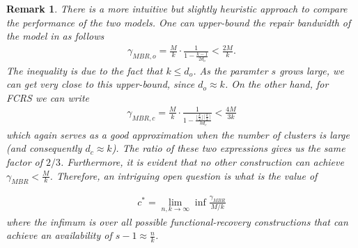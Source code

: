 \documentclass[journal,onecolumn,draftcls]{IEEEtran}
\newtheorem{rem}{Remark}
\begin{document}
\begin{rem}
There is a more intuitive but slightly heuristic approach to compare the performance of the two models. One can  upper-bound the repair bandwidth of the model in \cite{dimakis2010network} as follows
\begin{eqnarray}
\gamma_{MBR,o} = \frac{M}{k}\cdot\frac{1}{1 - \frac{k-1}{2d_o}} < \frac{2M}{k}.
\label{eqn:intuitiveboundo}
\end{eqnarray}
The inequality is due to the fact that $k \le d_o$. As the paramter $s$ grows large, we can get very close to this upper-bound, since $d_o\approx k$. On the other hand, for FCRS we can write
\begin{eqnarray}
\gamma_{MBR,c} =  \frac{M}{k}\cdot\frac{1}{1 - \frac{ \lfloor\frac{k}{2}\rfloor\lceil\frac{k}{2}\rceil}{kd_c}} < \frac{4M}{3k}
\label{eqn:intuitiveboundc}
\end{eqnarray}
which again serves as a good approximation when the number of clusters is large (and consequently $d_c \approx  k$). 
The ratio of these two expressions gives us the same factor of $2/3$. Furthermore, it is evident that no other construction can achieve $\gamma_{MBR} < \frac{M}{k}$. Therefore, an intriguing open question is what is the value of 

\begin{eqnarray*}
c^* = \lim_{n,k\rightarrow \infty}\inf  \frac{\gamma_{MBR}}{M/k}
\end{eqnarray*} 
where the infimum is over all possible functional-recovery constructions that can achieve an availability of $s -1 \approx \frac{n}{k}$.  
\end{rem}
\end{document}

